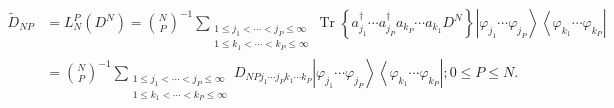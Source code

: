 \documentclass[aps,preprint]{revtex4}%
\begin{document}
\begin{align}
\tilde{D}_{NP} &  =L_{N}^{P}\left(  D^{N}\right)  =\binom{N}{P}^{-1}%
\sum_{\substack{1\leq j_{1}<\cdots<j_{P}\leq\infty\\1\leq k_{1}<\cdots
<k_{P}\leq\infty}}\operatorname{Tr}\left\{  a_{j_{1}}^{\dagger}\cdots
a_{j_{P}}^{\dagger}a_{k_{P}}\cdots a_{k_{1}}D^{N}\right\}  \left\vert
\varphi_{j_{1}}\cdots\varphi_{j_{P}}\right\rangle \left\langle \varphi_{k_{1}%
}\cdots\varphi_{k_{P}}\right\vert \nonumber\\
&  =\binom{N}{P}^{-1}\sum_{\substack{1\leq j_{1}<\cdots<j_{P}\leq\infty\\1\leq
k_{1}<\cdots<k_{P}\leq\infty}}D_{NPj_{1}\cdots j_{P}k_{1}\cdots k_{P}%
}\left\vert \varphi_{j_{1}}\cdots\varphi_{j_{P}}\right\rangle \left\langle
\varphi_{k_{1}}\cdots\varphi_{k_{P}}\right\vert ;0\leq P\leq N.
\end{align}
\end{document}
